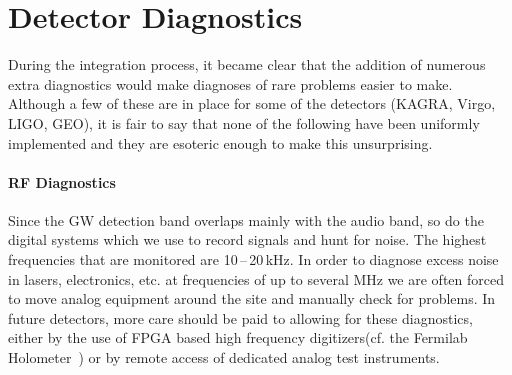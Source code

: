 %




\section{Detector Diagnostics}
\label{s:IDC:diagnostics}
During the integration process, it became clear that the addition of numerous
extra diagnostics would make diagnoses of rare problems easier to make. Although
a few of these are in place for some of the detectors (KAGRA, Virgo, LIGO, GEO),
it is fair to say that none of the following have been uniformly implemented and
they are esoteric enough to make this unsurprising.

\paragraph{RF Diagnostics}
Since the GW detection band overlaps mainly with the audio band, so do
the digital systems which we use to record signals and hunt for
noise. The highest frequencies that are monitored are
10\,--\,20\,kHz. In order to diagnose excess noise in lasers,
electronics, etc. at frequencies of up to several MHz we are often
forced to move analog equipment around the site and manually check for
problems. In future detectors, more care should be paid to allowing
for these diagnostics, either by the use of FPGA based high frequency digitizers(cf. the Fermilab Holometer~\cite{Chou:2017em}) or by remote access of dedicated analog test instruments.

